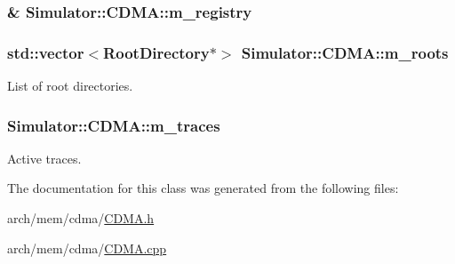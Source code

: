\hypertarget{class_simulator_1_1_c_d_m_a_a19056757fe35a1c17146564ddb0afecf}{
\subsubsection[{m\+\_\+registry}]{\& Simulator\+::\+C\+D\+M\+A\+::m\+\_\+registry\hspace{0.3cm}{\ttfamily [protected]}}}\label{class_simulator_1_1_c_d_m_a_a19056757fe35a1c17146564ddb0afecf}
\hypertarget{class_simulator_1_1_c_d_m_a_a71bfaa2e51ca8a4c5ffe6f75703c27d3}{
\subsubsection[{m\+\_\+roots}]{\setlength{\rightskip}{0pt plus 5cm}std\+::vector$<${\bf Root\+Directory}$\ast$$>$ Simulator\+::\+C\+D\+M\+A\+::m\+\_\+roots\hspace{0.3cm}{\ttfamily [protected]}}}\label{class_simulator_1_1_c_d_m_a_a71bfaa2e51ca8a4c5ffe6f75703c27d3}


List of root directories. 

\hypertarget{class_simulator_1_1_c_d_m_a_a077c382c9cf0488cd48c34d20351ea66}{
\subsubsection[{m\+\_\+traces}]{ Simulator\+::\+C\+D\+M\+A\+::m\+\_\+traces\hspace{0.3cm}{\ttfamily [protected]}}}\label{class_simulator_1_1_c_d_m_a_a077c382c9cf0488cd48c34d20351ea66}


Active traces. 



The documentation for this class was generated from the following files\+:\begin{DoxyCompactItemize}
\item 
arch/mem/cdma/\hyperlink{cdma_2_c_d_m_a_8h}{C\+D\+M\+A.\+h}\item 
arch/mem/cdma/\hyperlink{cdma_2_c_d_m_a_8cpp}{C\+D\+M\+A.\+cpp}\end{DoxyCompactItemize}
